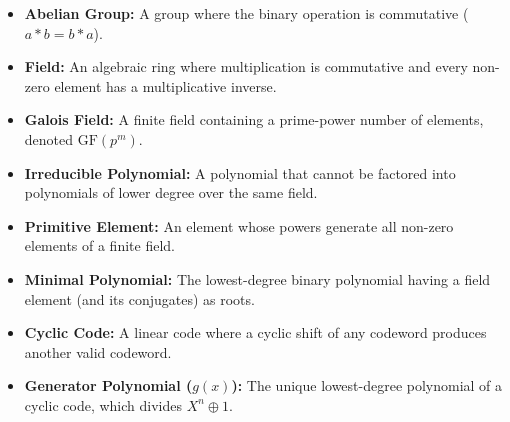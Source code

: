 \documentclass[12pt,a4paper]{article}
\begin{document}
\vspace{6pt}

\begin{tcolorbox}[defbox, title={\textbf{One-Line Definitions}}]
\begin{itemize}[leftmargin=*, itemsep=3pt, topsep=0pt]
  \item \textbf{Abelian Group:} A group where the binary operation is commutative ($a * b = b * a$).
  \item \textbf{Field:} An algebraic ring where multiplication is commutative and every non-zero element has a multiplicative inverse.
  \item \textbf{Galois Field:} A finite field containing a prime-power number of elements, denoted $\text{GF}(p^m)$.
  \item \textbf{Irreducible Polynomial:} A polynomial that cannot be factored into polynomials of lower degree over the same field.
  \item \textbf{Primitive Element:} An element whose powers generate all non-zero elements of a finite field.
  \item \textbf{Minimal Polynomial:} The lowest-degree binary polynomial having a field element (and its conjugates) as roots.
  \item \textbf{Cyclic Code:} A linear code where a cyclic shift of any codeword produces another valid codeword.
  \item \textbf{Generator Polynomial ($g(x)$):} The unique lowest-degree polynomial of a cyclic code, which divides $X^n \oplus 1$.
\end{itemize}
\end{tcolorbox}

\newpage
\end{document}
